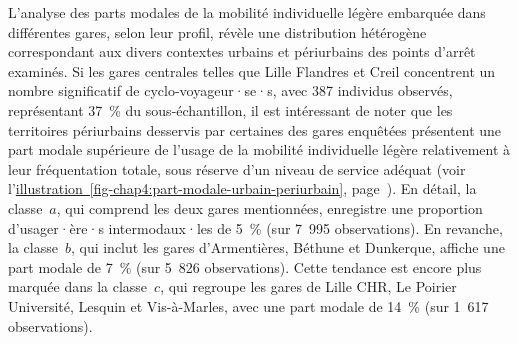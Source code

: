 \begin{refsegment}
L'analyse des parts modales de la mobilité individuelle légère embarquée dans différentes gares, selon leur profil, révèle une distribution hétérogène correspondant aux divers contextes urbains et périurbains des points d'arrêt examinés. Si les gares centrales telles que Lille Flandres et Creil concentrent un nombre significatif de cyclo-voyageur·se·s, avec 387 individus observés, représentant 37~\% du sous-échantillon, il est intéressant de noter que les territoires périurbains desservis par certaines des gares enquêtées présentent une part modale supérieure de l'usage de la mobilité individuelle légère relativement à leur fréquentation totale, sous réserve d'un niveau de service adéquat (voir l'\hyperref[fig-chap4:part-modale-urbain-periurbain]{illustration~\ref{fig-chap4:part-modale-urbain-periurbain}}, page~\pageref{fig-chap4:part-modale-urbain-periurbain}). En détail, la classe~\(a\), qui comprend les deux gares mentionnées, enregistre une proportion d'usager·ère·s intermodaux·les de 5~\% (sur 7~995 observations). En revanche, la classe~\(b\), qui inclut les gares d'Armentières, Béthune et Dunkerque, affiche une part modale de 7~\% (sur 5~826 observations). Cette tendance est encore plus marquée dans la classe~\(c\), qui regroupe les gares de Lille CHR, Le Poirier Université, Lesquin et Vis-à-Marles, avec une part modale de 14~\% (sur 1~617 observations).%


\end{refsegment}
